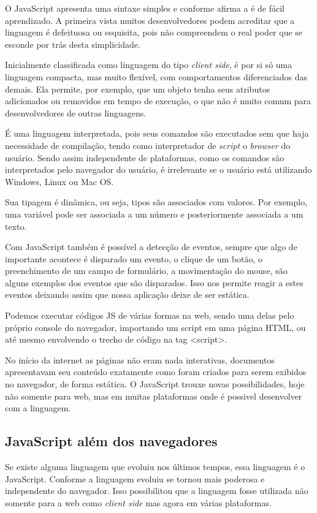 \documentclass[
	12pt,				%
	openright,			%
	twoside,			%
	a4paper,			%
	english,			%
	brazil				%
	]{abntex2}
\begin{document}
O JavaScript apresenta uma sintaxe simples e conforme afirma a \citeauthor{w3schools_javascript} é de fácil aprendizado. A primeira vista muitos desenvolvedores podem acreditar que a linguagem é defeituosa ou esquisita, pois não compreendem o real poder que se esconde por trás desta simplicidade.

Inicialmente classificada como linguagem do tipo \textit{client side}, é por si só uma linguagem compacta, mas muito flexível, com comportamentos diferenciados das demais. Ela permite, por exemplo, que um objeto tenha seus atributos adicionados ou removidos em tempo de execução, o que não é muito comum para desenvolvedores de outras linguagens.

É uma linguagem interpretada, pois seus comandos são executados sem que haja necessidade de compilação, tendo como interpretador de \textit{script} o \textit{browser} do usuário. Sendo assim independente de plataformas, como os comandos são interpretados pelo navegador do usuário, é irrelevante se o usuário está utilizando Windows, Linux ou Mac OS.

Sua tipagem é dinâmica, ou seja, tipos são associados com valores. Por exemplo, uma variável pode ser associada a um número e posteriormente associada a um texto.

Com JavaScript também é possível a detecção de eventos, sempre que algo de importante acontece é disparado um evento, o clique de um botão, o preenchimento de um campo de formulário, a movimentação do mouse, são alguns exemplos dos eventos que são disparados. Isso nos permite reagir a estes eventos deixando assim que nossa aplicação deixe de ser estática.

Podemos executar códigos JS de várias formas na web, sendo uma delas pelo próprio console do navegador, importando um script em uma página HTML, ou até mesmo envolvendo o trecho de código na tag <script>.

No início da internet as páginas não eram nada interativas, documentos apresentavam seu conteúdo exatamente como foram criados para serem exibidos no navegador, de forma estática. O JavaScript trouxe novas possibilidades, hoje não somente para web, mas em muitas plataformas onde é possivel desenvolver com a linguagem. 

\subsection{JavaScript além dos navegadores}

Se existe alguma linguagem que evoluiu nos últimos tempos, essa linguagem é o JavaScript. Conforme a linguagem evoluiu se tornou mais poderosa e independente do navegador. Isso possibilitou que a linguagem fosse utilizada não somente para a web como \textit{client side} mas agora em várias plataformas. 
\end{document}
